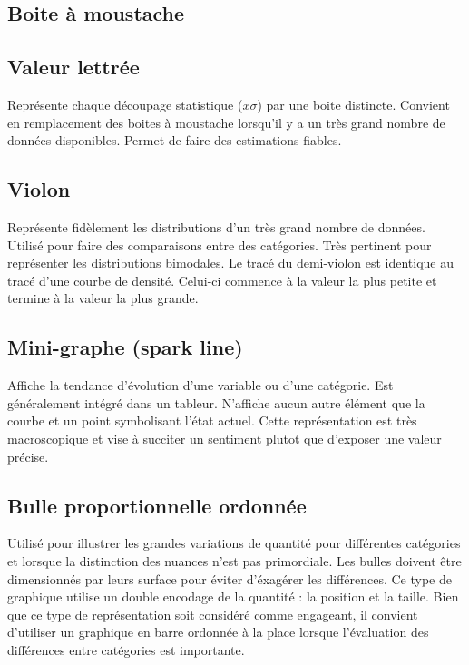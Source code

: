 \documentclass[a4paper,12pt]{article}
\begin{document}
\begin{multicols}{2}
\subsection*{Boite à moustache}
\label{sec:org9e7e60d}

\subsection*{Valeur lettrée}
\label{sec:org1873b4b}
Représente chaque découpage statistique (\(x\sigma\)) par une boite distincte. Convient en remplacement des boites à moustache lorsqu'il y a un très grand nombre de données disponibles. Permet de faire des estimations fiables.\autocite{hofmannLettervaluePlotsBoxplots2017}
\subsection*{Violon}
\label{sec:org9e02f1d}
Représente fidèlement les distributions d'un très grand nombre de données. Utilisé pour faire des comparaisons entre des catégories. Très pertinent pour représenter les distributions bimodales.\autocite{wilke9VisualizingMany2019} Le tracé du demi-violon est identique au tracé d'une courbe de densité. Celui-ci commence à la valeur la plus petite et termine à la valeur la plus grande.
\subsection*{Mini-graphe (spark line)}
\label{sec:org92bd031}
Affiche la tendance d'évolution d'une variable ou d'une catégorie. Est généralement intégré dans un tableur. N'affiche aucun autre élément que la courbe et un point symbolisant l'état actuel. Cette représentation est très macroscopique et vise à succiter un sentiment plutot que d'exposer une valeur précise.\autocite{jonathanschwabish6Distribution2021}
\subsection*{Bulle proportionnelle ordonnée}
\label{sec:org4b3bc22}
Utilisé pour illustrer les grandes variations de quantité pour différentes catégories et lorsque la distinction des nuances n'est pas primordiale. Les bulles doivent être dimensionnés par leurs surface pour éviter d'éxagérer les différences.\autocite{jonathanschwabish4ComparingCategories2021} Ce type de graphique utilise un double encodage de la quantité : la position et la taille.\autocite{wilke12VisualizingAssociations2019} Bien que ce type de représentation soit considéré comme engageant, il convient d'utiliser un graphique en barre ordonnée à la place lorsque l'évaluation des différences entre catégories est importante.\autocite{jonathanschwabish4ComparingCategories2021}

\end{multicols}
\end{document}

